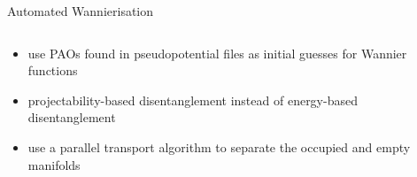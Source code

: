 \documentclass[xcolor=table,aspectratio=169]{beamer}
\numberwithin{equation}{section}
\begin{document}
\begin{frame}{Automated Wannierisation}
\begin{columns}
\begin{column}{0.5\textwidth}
         \begin{itemize}[<+(1)->]
            \item use PAOs found in pseudopotential files as initial guesses for Wannier functions
            \item projectability-based disentanglement instead of energy-based disentanglement
            \item use a parallel transport algorithm to separate the occupied and empty manifolds
         \end{itemize}
      \end{column}
      \begin{column}{0.5\textwidth}
         \begin{overlayarea}{\columnwidth}{0.6\paperheight}
            \begin{center}
            \end{center}
         \end{overlayarea}
      \end{column}
   \end{columns}

\end{frame}
\end{document}
